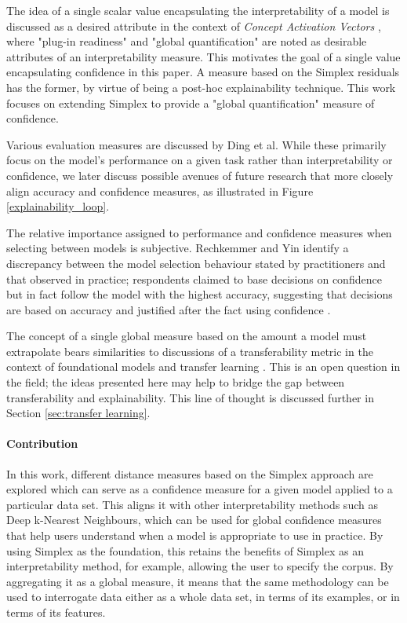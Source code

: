 \documentclass{article}
\begin{document}
The idea of a single scalar value encapsulating the interpretability of a model is discussed as a desired attribute in the context of \textit{Concept Activation Vectors} \cite{kim_interpretability_2018}, where "plug-in readiness" and "global quantification" are noted as desirable attributes of an interpretability measure. This motivates the goal of a single value encapsulating confidence in this paper.
A measure based on the Simplex residuals has the former, by virtue of being a post-hoc explainability technique. This work focuses on extending Simplex to provide a "global quantification" measure of confidence.

Various evaluation measures are discussed by Ding et al. \cite{ding_model_2018} While these primarily focus on the model's performance on a given task rather than interpretability or confidence, we later discuss possible avenues of future research that more closely align accuracy and confidence measures, as illustrated in Figure \ref{explainability_loop}.

The relative importance assigned to performance and confidence measures when selecting between models is subjective. Rechkemmer and Yin identify a discrepancy between the model selection behaviour stated by practitioners and that observed in practice; respondents claimed to base decisions on confidence but in fact follow the model with the highest accuracy, suggesting that decisions are based on accuracy and justified after the fact using confidence \cite{rechkemmer_when_2022}.

The concept of a single global measure based on the amount a model must extrapolate bears similarities to discussions of a transferability metric in the context of foundational models and transfer learning \cite{zhuang_comprehensive_2021} \cite{weber_transfer_2021} \cite{pan_survey_2010}. This is an open question in the field; the ideas presented here may help to bridge the gap between transferability and explainability. This line of thought is discussed further in Section \ref{sec:transfer learning}.

\paragraph{Contribution}
In this work, different distance measures based on the Simplex approach are explored which can serve as a confidence measure for a given model applied to a particular data set. This aligns it with other interpretability methods such as Deep k-Nearest Neighbours, which can be used for global confidence measures that help users understand when a model is appropriate to use in practice. By using Simplex as the foundation, this retains the benefits of Simplex as an interpretability method, for example, allowing the user to specify the corpus. By aggregating it as a global measure, it means that the same methodology can be used to interrogate data either as a whole data set, in terms of its examples, or in terms of its features.
\end{document}

